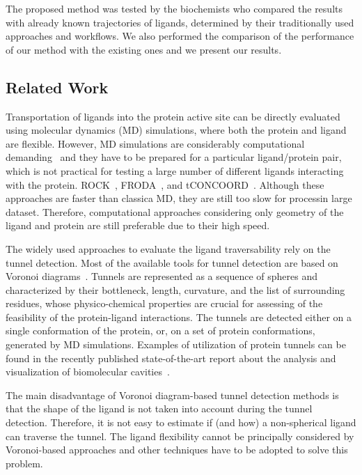 \documentclass{bmcart}
\begin{document}
The proposed method was tested by the biochemists who compared the results with already known trajectories of ligands, determined by their traditionally used approaches and workflows.
We also performed the comparison of the performance of our method with the existing ones and we present our results.


\subsection*{Related Work}

Transportation of ligands into the protein active site can be directly evaluated using molecular dynamics (MD) simulations, where both the protein and ligand are flexible.
However, MD simulations are considerably computational demanding~\cite{kingsley2014including} and they have to be prepared
for a particular ligand/protein pair, which is not practical for testing a large number of different ligands interacting with the protein.
ROCK~\cite{lei2004sampling}, FRODA~\cite{wells2005constrained}, and tCONCOORD~\cite{seeliger2007geometry}.
Although these approaches are faster than classica MD, they are still too slow for processin large dataset.
Therefore, computational approaches considering only geometry of the ligand and protein are still preferable due to their high speed.

The widely used approaches to evaluate the ligand traversability rely on the tunnel detection.
Most of the available tools for tunnel detection are based on Voronoi diagrams~\cite{yaffe2008,caver3,sehnal2013mole}.
Tunnels are represented as a sequence of spheres and characterized by their bottleneck, length, curvature, and the list of surrounding residues, whose physico-chemical properties are crucial for assessing of the feasibility of the protein-ligand interactions.
The tunnels are detected either on a single conformation of the protein, or, on a set of protein conformations, generated by MD simulations.
Examples of utilization of protein tunnels can be found in the recently published state-of-the-art report about the analysis and visualization of biomolecular cavities~\cite{Krone_2016}.

The main disadvantage of Voronoi diagram-based tunnel detection methods is that the shape of the ligand is not taken into account during the tunnel detection.
Therefore, it is not easy to estimate if (and how) a non-spherical ligand can traverse the tunnel.
The ligand flexibility cannot be principally considered by Voronoi-based approaches and other techniques have to be adopted to solve this problem.
\end{document}
